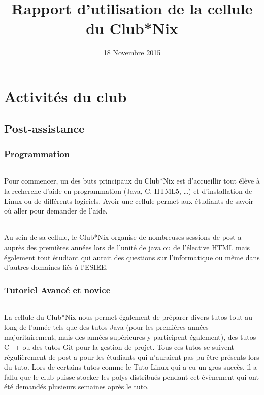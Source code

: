 \documentclass[11pt]{report}
\title{Rapport d'utilisation de la cellule du Club*Nix}
\date{18 Novembre 2015}
\begin{document}
\maketitle

\tableofcontents

\part{Activités du club}

\chapter{Post-assistance}

\section{Programmation}

\paragraph{} Pour commencer, un des buts principaux du Club*Nix est
d'accueillir tout élève à la recherche d'aide en programmation (Java, C, HTML5,
\ldots) et d'installation de Linux ou de différents logiciels. Avoir une cellule
permet aux étudiants de savoir où aller pour demander de l'aide.

\paragraph{} Au sein de sa cellule, le Club*Nix organise de nombreuses sessions
de post-a auprès des premières années lors de l'unité de java ou de l'élective
HTML mais également tout étudiant qui aurait des questions sur l'informatique
ou même dans d'autres domaines liés à l'ESIEE.

\section{Tutoriel Avancé et novice}

\paragraph{} La cellule du Club*Nix nous permet également de préparer divers
tutos tout au long de l'année tels que des tutos Java (pour les premières
années majoritairement, mais des années supérieures y participent également),
des tutos C++ ou des tutos Git pour la gestion de projet. Tous ces tutos se
suivent régulièrement de post-a pour les étudiants qui n'auraient pas pu être
présents lors du tuto. Lors de certains tutos comme le Tuto Linux qui a eu un
gros succès, il a fallu que le club puisse stocker les polys distribués pendant
cet évènement qui ont été demandés plusieurs semaines après le tuto.
\end{document}
